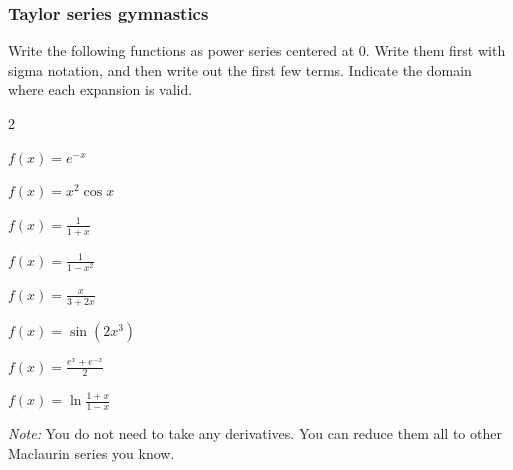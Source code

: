 \documentclass[14pt]{beamer}
\begin{document}
\begin{frame}[t]
	\fontsize{13}{13}\selectfont
	\frametitle{Taylor series gymnastics}

	Write the following functions as power series centered at $0$. Write them
	first with sigma notation, and then write out the first few terms. Indicate
	the domain where each expansion is valid.

	\begin{enumerate}
	\end{enumerate}
	\vspace{.2cm}

	\emph{Note:} You do not need to take any derivatives. You can reduce them all to
	other Maclaurin series you know.
\end{frame}
\end{document}
